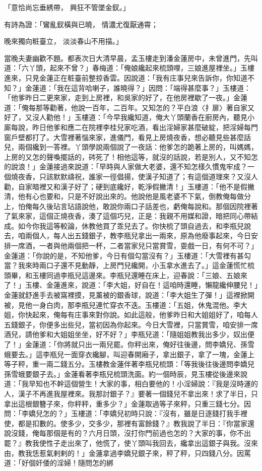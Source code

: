 「意恰尚忘垂綉帶， 興狂不管墜金釵。」

有詩為證：「鸞亂釵橫與已曉， 情濃尤復厭通霄；

晚來獨向粧臺立， 淡淡春山不用描。」

當晚夫妻幽歡不題。都表次日大清早晨，孟玉樓走到潘金蓮房中，未曾進門，先叫道：「六丫頭，起來不曾？」春梅道：「俺娘纔起來梳頭哩，三娘進屋裡坐。」玉樓進來，只見金蓮正在粧臺前整掠香雲。因說道：「我有庄事兒來告訴你，你知道不知？」金蓮道：「我在這背哈喇子，誰曉得？」因問：「端得甚麼事？」玉樓道：「他爹昨日二更來家，走到上房裡，和吳家的好了，在他房裡歇了一夜。」金蓮道：「俺每那等勸著，他說一百年，二百年。又知怎的？平白浪〈扌扉〉著自家又好了，又沒人勸他！」玉樓道：「今早我纔知道，俺大丫頭蘭香在廚房內，聽見小廝每說，昨日他爹和應二在院裡李桂兒家吃酒，看出淫婦家甚麼破綻，把淫婦每門窗戶壁都打了。大雪裡著惱來家，進儀門，看見上房燒夜香，想必聽見些甚麼話兒，兩個纔到一答裡。丫頭學說兩個說了一夜話：他爹怎的跪著上房的，叫媽媽，上房的又怎的聲喚擺話的，硶死了！相他這等，就沒的話說，若是別人，又不知怎的說浪！」金蓮接過來說道：「早時與人家做大老婆，還不知怎樣久慣鬼牢成？一個燒夜香，只該默默禱祝，誰家一徑倡揚，使漢子知道了；有這個道理來？又沒人勸，自家暗裡又和漢子好了；硬到底纔好，乾淨假撇清！」玉樓道：「他不是假撇清，他有心也要和，只是不好說出來的。他說他是風老婆不下氣，倒教俺每做分上，怕俺每久後玷言玷語說他，敢說你兩口子話差也，虧俺每說和。那個因院裡著了氣來家，這個正燒夜香，湊了這個巧兒，正是：我親不用媒和證，暗把同心帶結成。如今你我這等較論，休教他買了乖兒去了。你快梳了頭自過去，和李瓶兒說去，咱兩個人，每人出五錢銀子，教李瓶兒拿出一兩來，原為他廢事起來，今日安排一席酒，一者與他兩個把一杯，二者當家兒只當賞雪，耍戲一日，有何不可？」金蓮道：「你說的是，不知他爹，今日有個勾當沒有？」玉樓道：「大雪裡有甚勾當？我來時兩口子還不見動靜，上房門兒纔開，小玉拿水進去了。」這金蓮慌忙梳頭畢，和玉樓同過李瓶兒這邊來。李瓶兒還睡在床上，迎春說：「三娘、五娘來了！」玉樓、金蓮進來，說道：「李大姐，好自在！這咱時還睡，懶龍纔伸腰兒！」金蓮就舒進手去被窩裡摸，見薰被的銀香球，說道：「李大姐生了彈！」這裡掀開被，見他一身白肉，那李瓶兒連忙穿衣不迭。玉樓道：「五姐，休鬼混他。李大姐，你快起來，俺每有庄事來對你說。如此這般，他爹昨日和大姐姐好了，咱每人五錢銀子，你便多出些兒，當初因為你起來。今日大雪裡，只當賞雪，咱安排一席酒兒，請他爹和大姐姐坐坐，好不好？」李瓶兒道：「隨姐姐教我出多少，奴出便了！」金蓮道：「你將就只出一兩兒罷。你秤出來，俺好往後邊，問李嬌兒、孫雪蛾要去。」這李瓶兒一面穿衣纔腳，叫迎春開廂子，拿出銀子，拿了一塊，金蓮上等子秤，重一兩二錢五分。玉樓教金蓮伴著李瓶兒梳頭：「等我後往後邊問李嬌兒孫雪蛾要銀子去。」金蓮看著李瓶兒梳頭洗面。約一個時辰，見玉樓從後邊來說道：「我早知也不幹這個營生！大家的事，相白要他的！小淫婦說：『我是沒時運的人，漢子不再進我屋裡來。我那討銀子？』要著一個錢兒不拿出來！求了半日，只拿出這根銀簪子來，你秤秤，重多少？」金蓮取過等子來秤，只重三錢七分。因問：「李嬌兒怎的？」玉樓道：「李嬌兒初時只說：『沒有，雖是日逐錢打我手裡使，都是扣數的。使多少，交多少，那裡有富餘錢？』教我說了半日：『你當家還說沒錢，俺每那個是有的？六月日頭，沒打你門前過也怎的？大家的事，你不出罷？』教我使性子走出來了，他慌了，使丫頭叫我回去，纔拿出這銀子與我。沒來由，教我恁惹氣剌剌的！」金蓮拿過李嬌兒銀子來，秤了秤，只四錢八分。因罵道：「好個奸倭的淫婦！隨問怎的綁